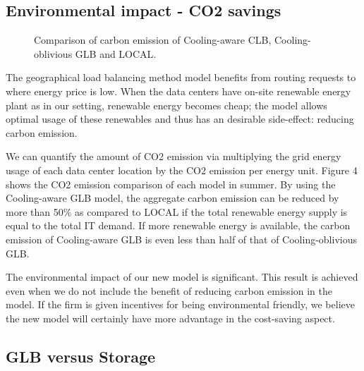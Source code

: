 \documentclass{acm_proc_article-sp}
\begin{document}
\subsection{Environmental impact - CO2 savings}


\begin{figure}
\centering
{}
\caption{Comparison of carbon emission of Cooling-aware CLB, Cooling-oblivious GLB and LOCAL.}
\end{figure}


The geographical load balancing method model benefits from routing requests to where energy price is low. When the data centers have on-site renewable energy plant as in our setting, renewable energy becomes cheap; the model allows optimal usage of these renewables and thus has an desirable side-effect: reducing carbon emission. 

We can quantify the amount of CO2 emission via multiplying the grid energy usage of each data center location by the CO2 emission per energy unit. Figure 4 shows the CO2 emission comparison of each model in summer. By using the Cooling-aware GLB model, the aggregate carbon emission can be reduced by more than 50\% as compared to LOCAL if the total renewable energy supply is equal to the total IT demand. If more renewable energy is available, the carbon emission of Cooling-aware GLB is even less than half of that of Cooling-oblivious GLB. 

The environmental impact of our new model is significant. This result is achieved even when we do not include the benefit of reducing carbon emission in the model. If the firm is given incentives for being environmental friendly, we believe the new model will certainly have more advantage in the cost-saving aspect.



\subsection{GLB versus Storage}
\end{document}
